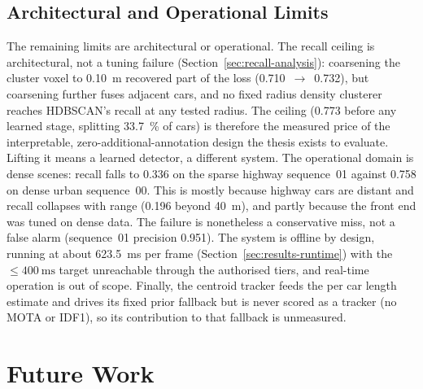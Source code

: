 \documentclass[a4paper,12pt]{report}
\begin{document}
\subsection{Architectural and Operational Limits}
\label{sec:disc-architectural}

The remaining limits are architectural or operational. The recall ceiling is architectural,
not a tuning failure (Section~\ref{sec:recall-analysis}): coarsening the cluster voxel to
\SI{0.10}{\metre} recovered part of the loss (\num{0.710}~$\rightarrow$~\num{0.732}), but
coarsening further fuses adjacent cars, and no fixed radius density clusterer reaches HDBSCAN's
recall at any tested radius. The ceiling (\num{0.773} before any learned stage, splitting
\SI{33.7}{\percent} of cars) is therefore the measured price of the interpretable,
zero-additional-annotation design the thesis exists to evaluate. Lifting it
means a learned detector, a different system. The operational domain is dense scenes: recall falls to
\num{0.336} on the sparse highway sequence~01 against \num{0.758} on dense urban sequence~00.
This is mostly because highway cars are distant and recall collapses with range (\num{0.196} beyond
\SI{40}{\metre}), and partly because the front end was tuned on dense data. The failure
is nonetheless a conservative miss, not a false alarm (sequence~01 precision \num{0.951}). The system is
offline by design, running at about \SI{623.5}{\milli\second} per frame
(Section~\ref{sec:results-runtime}) with the $\leq\SI{400}{\milli\second}$ target unreachable
through the authorised tiers, and real-time operation is out of scope. Finally, the centroid
tracker feeds the per car length estimate and drives its fixed prior fallback but is never
scored as a tracker (no MOTA or IDF1), so its contribution to that fallback is unmeasured.


\section{Future Work}
\label{sec:conclusion-future}
\end{document}

